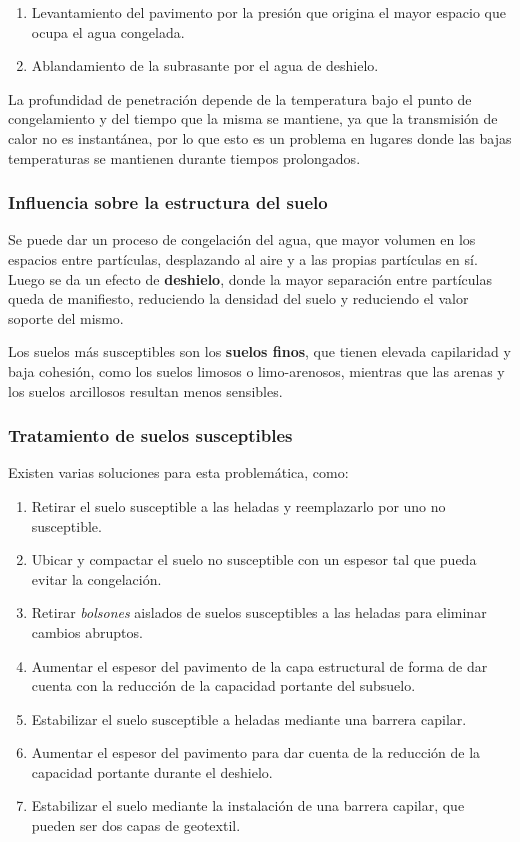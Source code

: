 \documentclass[../main.tex]{subfiles}
\begin{document}
\begin{enumerate}
  \item Levantamiento del pavimento por la presión que origina el mayor espacio
    que ocupa el agua congelada.
  \item Ablandamiento de la subrasante por el agua de deshielo.
\end{enumerate}

La profundidad de penetración depende de la temperatura bajo el punto de
congelamiento y del tiempo que la misma se mantiene, ya que la transmisión de 
calor no es instantánea, por lo que esto es un problema en lugares donde las 
bajas temperaturas se mantienen durante tiempos prolongados.

\subsubsection{Influencia sobre la estructura del suelo}

Se puede dar un proceso de congelación del agua, que mayor volumen en los
espacios entre partículas, desplazando al aire y a las propias partículas en sí.
Luego se da un efecto de \textbf{deshielo}, donde la mayor separación entre partículas
queda de manifiesto, reduciendo la densidad del suelo y reduciendo el valor
soporte del mismo.

Los suelos más susceptibles son los \textbf{suelos finos}, que tienen elevada
capilaridad y baja cohesión, como los suelos limosos o limo-arenosos, mientras
que las arenas y los suelos arcillosos resultan menos sensibles.

\subsubsection{Tratamiento de suelos susceptibles}

Existen varias soluciones para esta problemática, como:

\begin{enumerate}
  \item Retirar el suelo susceptible a las heladas y reemplazarlo por uno no
    susceptible.
  \item Ubicar y compactar el suelo no susceptible con un espesor tal que pueda
    evitar la congelación.
  \item Retirar \textit{bolsones} aislados de suelos susceptibles a las heladas
    para eliminar cambios abruptos.
  \item Aumentar el espesor del pavimento de la capa estructural de forma
    de dar cuenta con la reducción de la capacidad portante del subsuelo.
  \item Estabilizar el suelo susceptible a heladas mediante una barrera
    capilar.
  \item Aumentar el espesor del pavimento para dar cuenta de la reducción de la 
    capacidad portante durante el deshielo.
  \item Estabilizar el suelo mediante la instalación de una barrera capilar, que 
    pueden ser dos capas de geotextil.
\end{enumerate}
\end{document}

